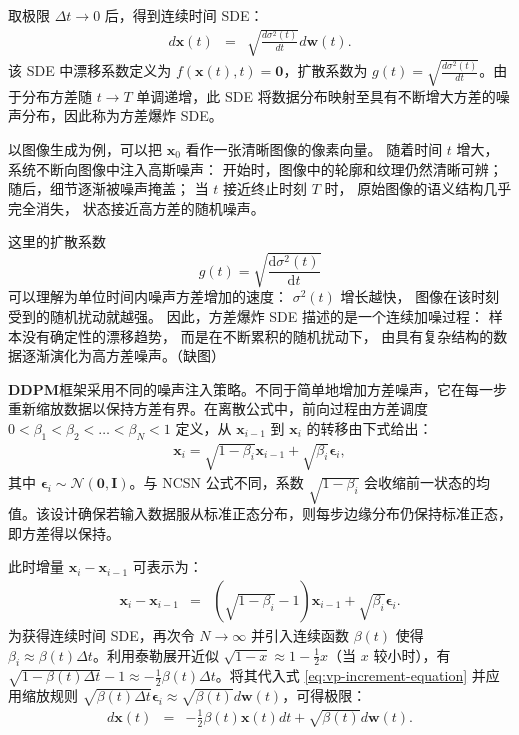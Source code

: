 \documentclass[UTF8,a4paper,zihao=-4,oneside,openany]{ctexbook}
\begin{document}
取极限 $\Delta t \to 0$ 后，得到连续时间 SDE：
\begin{eqnarray}
d\mathbf{x}(t) & = & \sqrt{\frac{d\sigma^2(t)}{dt}} d\mathbf{w}(t).
\label{eq:ve-sde}
\end{eqnarray}
该 SDE 中漂移系数定义为 $f(\mathbf{x}(t), t) = \mathbf{0}$，扩散系数为 $g(t) = \sqrt{\frac{d\sigma^2(t)}{dt}}$。由于分布方差随 $t \to T$ 单调递增，此 SDE 将数据分布映射至具有不断增大方差的噪声分布，因此称为方差爆炸 SDE。

以图像生成为例，可以把
\(\mathbf{x}_0\)
看作一张清晰图像的像素向量。
随着时间 \(t\) 增大，系统不断向图像中注入高斯噪声：
开始时，图像中的轮廓和纹理仍然清晰可辨；
随后，细节逐渐被噪声掩盖；
当 \(t\) 接近终止时刻 \(T\) 时，
原始图像的语义结构几乎完全消失，
状态接近高方差的随机噪声。

这里的扩散系数
\[
    g(t)
    =
    \sqrt{
        \frac{\mathrm{d}\sigma^2(t)}
        {\mathrm{d}t}
    }
\]
可以理解为单位时间内噪声方差增加的速度：
\(\sigma^2(t)\) 增长越快，
图像在该时刻受到的随机扰动就越强。
因此，方差爆炸 SDE 描述的是一个连续加噪过程：
样本没有确定性的漂移趋势，
而是在不断累积的随机扰动下，
由具有复杂结构的数据逐渐演化为高方差噪声。（缺图）

\textbf{DDPM}框架采用不同的噪声注入策略。不同于简单地增加方差噪声，它在每一步重新缩放数据以保持方差有界。在离散公式中，前向过程由方差调度 $0 < \beta_1 < \beta_2 < \dots < \beta_N < 1$ 定义，从 $\mathbf{x}_{i-1}$ 到 $\mathbf{x}_i$ 的转移由下式给出：
\begin{eqnarray}
\mathbf{x}_i = \sqrt{1 - \beta_i} \mathbf{x}_{i-1} + \sqrt{\beta_i} \boldsymbol{\epsilon}_i,
\end{eqnarray}
其中 $\boldsymbol{\epsilon}_i \sim \mathcal{N}(\mathbf{0}, \mathbf{I})$。与 NCSN 公式不同，系数 $\sqrt{1 - \beta_i}$ 会收缩前一状态的均值。该设计确保若输入数据服从标准正态分布，则每步边缘分布仍保持标准正态，即方差得以保持。

此时增量 $\mathbf{x}_i - \mathbf{x}_{i-1}$ 可表示为：
\begin{eqnarray}
\mathbf{x}_i - \mathbf{x}_{i-1} & = & (\sqrt{1 - \beta_i} - 1) \mathbf{x}_{i-1} + \sqrt{\beta_i} \boldsymbol{\epsilon}_i.
\label{eq:vp-increment-equation}
\end{eqnarray}
为获得连续时间 SDE，再次令 $N \to \infty$ 并引入连续函数 $\beta(t)$ 使得 $\beta_i \approx \beta(t) \Delta t$。利用泰勒展开近似 $\sqrt{1 - x} \approx 1 - \frac{1}{2}x$（当 $x$ 较小时），有 $\sqrt{1 - \beta(t) \Delta t} - 1 \approx -\frac{1}{2}\beta(t) \Delta t$。将其代入式 \eqref{eq:vp-increment-equation} 并应用缩放规则 $\sqrt{\beta(t) \Delta t} \boldsymbol{\epsilon}_i \approx \sqrt{\beta(t)} d\mathbf{w}(t)$，可得极限：
\begin{eqnarray}
d\mathbf{x}(t) & = & -\frac{1}{2} \beta(t) \mathbf{x}(t) d t + \sqrt{\beta(t)} d\mathbf{w}(t).
\label{eq:vp-sde}
\end{eqnarray}
\end{document}
